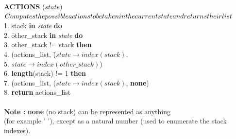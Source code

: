 \documentclass{article}
\begin{document}
\begin{center}
\begin{tabbing}
\textbf{ACTIONS} ($state$) \\
\rhd$ Computes the possible actions to be taken in the current state and\\ returns their list$\\
1.  \=stack \textbf{in} \textit{state} {\bf do} \\
2. \indent{} \={other\_stack} \textbf{in} \textit{state} {\bf do} \\
3. \indent\>  \={other\_stack} != stack {\bf then} \\
4. \indent\>\> ({actions\_list}, (\=$state \rightarrow index(stack)$,  \\
5. \indent\>\>\>\>$state \rightarrow index(other\_stack)$)\\
6. \indent{}  \={\bf length}(stack) != 1 {\bf then} \\
7. \indent\> (actions\_list, ($state \rightarrow index(stack)$, \textbf{none}) \\
8. \indent \textbf{return} {actions\_list}\\
\\
\textbf{Note :} \textbf{none} (no stack) can be represented as anything\\
(for example ' '), except as a natural number (used to enumerate the stack indexes).
\end{tabbing}
\end{center}
\vspace{8cm}
\vfill
\end{document}
